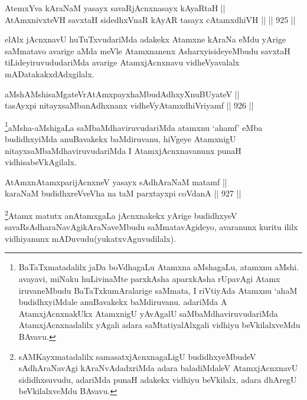 \begin{shl}
AtemxYva kAraNaM yasayx savaRjAcnxnasayx kAyaRtaH || \\
AtAmxnivxteVH savxtaH sidedhxVnaR kAyAR tasayx cA\s \s tamxdhiVH ||  ||  925 ||  
\end{shl}

\begin{artha}
elAlx jAcnxnavU huTuTxvudariMda adakekx Atamxne kAraNa eMdu yArige saMmatavo avarige aMda meVle Atamxnanenx AsharxyisideyeMbudu savxtaH tiLideyiruvududariMda avarige AtamxjAcnxnavu vidheVyavalalx mADatakakxdAdxgilalx.
\end{artha}


\begin{shl}
aMshAMshisaMgateVrAtAmx\s payxhaMbudAdhxyX\s nuBUyateV || \\
tasAyxpi nitayxsaMbanAdhxnanx vidheVyA\s \s tamxdhiVriyamf ||  926 ||  
\end{shl}

\begin{artha}
\footnote{BaTaTxmatadalilx jaDa boVdhagaLu Atamxna aMshagaLu, atamxnu aMshi. avayavi, miNaku huLivinaMte parxkAsha aparxkAsha rUpavAgi Atamx iruvaneMbudu BaTaTxkumAralarige saMmata, I riVtiyAda Atamxnu `ahaM budidhxyiMdale anuBavakekx baMdiruvanu. adariMda A AtamxjAcnxnakUkx AtamxnigU yAvAgalU saMbaMdhaviruvudariMda AtamxjAcnxnadalilx yAgali adara saMtatiyalAlxgali vidhiyu beVkilalxveMdu BAvavu.}aMsha-aMshigaLa saMbaMdhaviruvudariMda atamxnu `ahamf' eMba budidhxyiMda anuBavakekx baMdiruvanu, hiVgeye AtamxnigU nitayxsaMbaMdhaviruvudariMda I AtamxjAcnxnavanunx punaH vidhisabeVkAgilalx.
\end{artha}


\begin{shl}
AtAmxnAtamxparijAcnxneV yasayx sAdhAraNaM matamf || \\
karaNaM budidhxreVveVha na taM parxtayxpi coVdanA ||  927 ||  
\end{shl}

\begin{artha}
\footnote{sAMKayxmatadalilx samasatxjAcnxnagaLigU budidhxyeMbudeV sAdhAraNavAgi kAraNvAdadxriMda adara baladiMdaleV AtamxjAcnxnavU sididhxsuvudu, adariMda punaH adakekx vidhiyu beVkilalx, adara dhAregU beVkilalxveMdu BAvavu.}Atamx matutx anAtamxgaLa jAcnxnakekx yArige budidhxyeV savaRsAdharaNavAgikAraNaveMbudu saMmatavAgideyo, avaranunx kuritu ililx vidhiyanunx mADuvudu(yukatxvAguvudilalx).
\end{artha}


